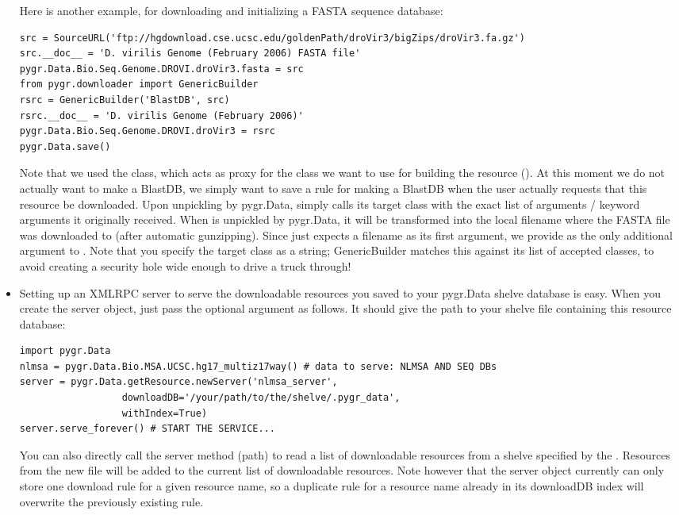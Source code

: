 \documentclass{howto}
\begin{document}
\begin{itemize}
Here is another example, for downloading and initializing a
FASTA sequence database:
\begin{verbatim}
src = SourceURL('ftp://hgdownload.cse.ucsc.edu/goldenPath/droVir3/bigZips/droVir3.fa.gz')
src.__doc__ = 'D. virilis Genome (February 2006) FASTA file'
pygr.Data.Bio.Seq.Genome.DROVI.droVir3.fasta = src
from pygr.downloader import GenericBuilder
rsrc = GenericBuilder('BlastDB', src)
rsrc.__doc__ = 'D. virilis Genome (February 2006)'
pygr.Data.Bio.Seq.Genome.DROVI.droVir3 = rsrc
pygr.Data.save()
\end{verbatim}
Note that we used the  class, which acts as proxy
for the class we want to use for building the resource ().
At this moment we do not actually want to make a BlastDB, we simply
want to save a rule for making a BlastDB when the user actually
requests that this resource be downloaded.  
Upon unpickling by pygr.Data, 
simply calls its target class with the exact list of arguments / 
keyword arguments it originally received.  When  is
unpickled by pygr.Data, it will be transformed into the local
filename where the FASTA file was downloaded to (after automatic gunzipping).
Since  just expects a filename as its first argument,
we provide  as the only additional argument to .
Note that you specify the target class as a string; GenericBuilder
matches this against its list of accepted classes, to avoid creating
a security hole wide enough to drive a truck through!

\item Setting up an XMLRPC server to serve the downloadable 
resources you saved to your pygr.Data shelve database is easy.    
When you create the server object, just pass the optional 
 argument as follows.  It should give
the path to your shelve file containing this resource database:

\begin{verbatim}
import pygr.Data
nlmsa = pygr.Data.Bio.MSA.UCSC.hg17_multiz17way() # data to serve: NLMSA AND SEQ DBs
server = pygr.Data.getResource.newServer('nlmsa_server',
                  downloadDB='/your/path/to/the/shelve/.pygr_data',
                  withIndex=True)
server.serve_forever() # START THE SERVICE...
\end{verbatim}
You can also directly call the server method (path)
to read a list of downloadable resources from a shelve specified by
the .  Resources from the new file will be added to
the current list of downloadable resources.
Note however that the server object currently can only store one
download rule for a given resource name, so a duplicate rule for
a resource name already in its downloadDB index will overwrite the
previously existing rule.

\end{itemize}
\end{document}
